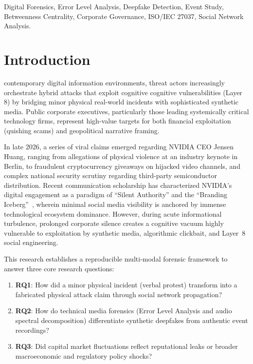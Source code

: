 \documentclass[journal,10pt,compsoc]{IEEEtran}
\begin{document}
\begin{IEEEkeywords}
Digital Forensics, Error Level Analysis, Deepfake Detection, Event Study, Betweenness Centrality, Corporate Governance, ISO/IEC 27037, Social Network Analysis.
\end{IEEEkeywords}

\section{Introduction}
 contemporary digital information environments, threat actors increasingly orchestrate hybrid attacks that exploit cognitive cognitive vulnerabilities (Layer 8) by bridging minor physical real-world incidents with sophisticated synthetic media. Public corporate executives, particularly those leading systemically critical technology firms, represent high-value targets for both financial exploitation (quishing scams) and geopolitical narrative framing.

In late 2026, a series of viral claims emerged regarding NVIDIA CEO Jensen Huang, ranging from allegations of physical violence at an industry keynote in Berlin, to fraudulent cryptocurrency giveaways on hijacked video channels, and complex national security scrutiny regarding third-party semiconductor distribution. Recent communication scholarship has characterized NVIDIA's digital engagement as a paradigm of ``Silent Authority'' and the ``Branding Iceberg''~\cite{sari2026silent}, wherein minimal social media visibility is anchored by immense technological ecosystem dominance. However, during acute informational turbulence, prolonged corporate silence creates a cognitive vacuum highly vulnerable to exploitation by synthetic media, algorithmic clickbait, and Layer~8 social engineering. 

This research establishes a reproducible multi-modal forensic framework to answer three core research questions:
\begin{enumerate}
    \item \textbf{RQ1}: How did a minor physical incident (verbal protest) transform into a fabricated physical attack claim through social network propagation?
    \item \textbf{RQ2}: How do technical media forensics (Error Level Analysis and audio spectral decomposition) differentiate synthetic deepfakes from authentic event recordings?
    \item \textbf{RQ3}: Did capital market fluctuations reflect reputational leaks or broader macroeconomic and regulatory policy shocks?
\end{enumerate}
\end{document}
